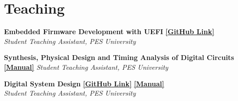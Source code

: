\section{\sc Teaching}

{\bf{Embedded Firmware Development with UEFI}} \href{https://github.com/govardhnn/UEFI_AHP}{{\bf{[GitHub Link]}}} \\
\textit{Student Teaching Assistant, PES University}

{\bf{Synthesis, Physical Design and Timing Analysis of Digital Circuits}}  \href{https://bit.ly/mentorlabpesu}{{\bf{[Manual]}}}
\textit{Student Teaching Assistant, PES University} 

{\bf{Digital System Design}} \href{https://github.com/govardhnn/DSD_AHP}{{\bf[GitHub Link]}} \href{https://bit.ly/cadencelabpesu}{{\bf{[Manual]}}} \\
\textit{Student Teaching Assistant, PES University}

\endinput
